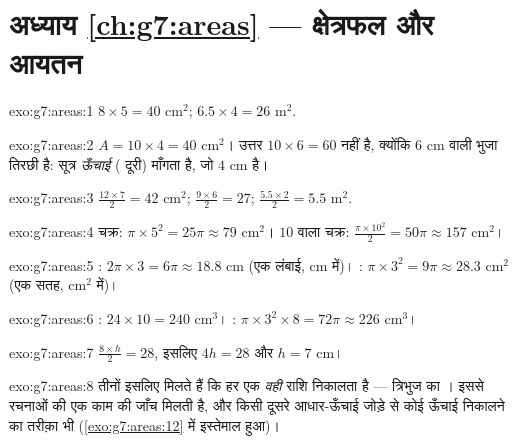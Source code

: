 \section*{अध्याय \ref{ch:g7:areas} --- क्षेत्रफल और आयतन}

\begin{solution}{exo:g7:areas:1}
$8 \times 5 = 40$ cm$^2$; \qquad $6.5 \times 4 = 26$ m$^2$.
\end{solution}

\begin{solution}{exo:g7:areas:2}
$A = 10 \times 4 = 40$ cm$^2$। उत्तर $10 \times 6 = 60$ नहीं है,
क्योंकि $6$ cm वाली भुजा तिरछी है: सूत्र \emph{ऊँचाई} ( दूरी)
माँगता है, जो $4$ cm है।
\end{solution}

\begin{solution}{exo:g7:areas:3}
$\frac{12 \times 7}{2} = 42$ cm$^2$; \quad
$\frac{9 \times 6}{2} = 27$; \quad
$\frac{5.5 \times 2}{2} = 5.5$ m$^2$.
\end{solution}

\begin{solution}{exo:g7:areas:4}
चक्र: $\pi \times 5^2 = 25\pi \approx 79$ cm$^2$। $10$ 
वाला  चक्र: $\frac{\pi \times 10^2}{2} = 50\pi \approx 157$ cm$^2$।
\end{solution}

\begin{solution}{exo:g7:areas:5}
: $2\pi \times 3 = 6\pi \approx 18.8$ cm (एक लंबाई, cm में)।
: $\pi \times 3^2 = 9\pi \approx 28.3$ cm$^2$ (एक सतह,
cm$^2$ में)।
\end{solution}

\begin{solution}{exo:g7:areas:6}
: $24 \times 10 = 240$ cm$^3$। :
$\pi \times 3^2 \times 8 = 72\pi \approx 226$ cm$^3$।
\end{solution}

\begin{solution}{exo:g7:areas:7}
$\frac{8 \times h}{2} = 28$, इसलिए $4h = 28$ और $h = 7$ cm।
\end{solution}

\begin{solution}{exo:g7:areas:8}
तीनों  इसलिए मिलते हैं कि हर एक \emph{वही} राशि निकालता है
--- त्रिभुज का । इससे रचनाओं की एक काम की जाँच मिलती है,
और किसी दूसरे आधार-ऊँचाई जोड़े से कोई ऊँचाई निकालने का तरीक़ा भी
(\cref{exo:g7:areas:12} में इस्तेमाल हुआ)।
\end{solution}

